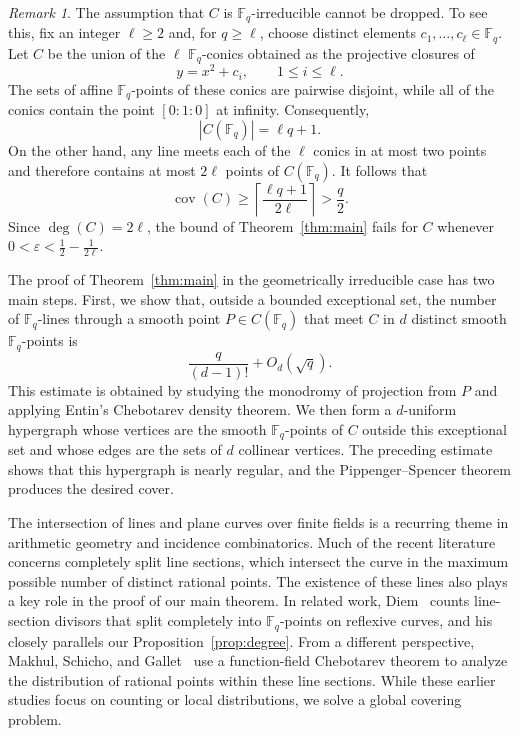 \documentclass[12pt,reqno]{amsart}
\theoremstyle{definition}
\theoremstyle{remark}
\newtheorem{remark}[theorem]{Remark}
\newcommand{\Fq}{\mathbb{F}_q}
\begin{document}
\begin{remark}\label{rem:Fq-irreducibility-necessary}
The assumption that $C$ is $\Fq$-irreducible cannot be dropped. To see this, fix an integer $\ell\geq 2$ and, for $q\geq\ell$, choose distinct elements $c_1,\ldots,c_\ell\in\Fq$. Let $C$ be the union of the $\ell$ $\Fq$-conics obtained as the projective closures of
\[
y=x^2+c_i,\qquad 1\leq i\leq\ell.
\]
The sets of affine $\Fq$-points of these conics are pairwise disjoint, while all of the conics contain the point $[0:1:0]$ at infinity. Consequently,
\[
|C(\Fq)|=\ell q+1.
\]
On the other hand, any line meets each of the $\ell$ conics in at most two points and therefore contains at most $2\ell$ points of $C(\Fq)$. It follows that
\[
\operatorname{cov}(C)
\geq
\left\lceil\frac{\ell q+1}{2\ell}\right\rceil
>
\frac{q}{2}.
\]
Since $\deg(C)=2\ell$, the bound of Theorem~\ref{thm:main} fails for $C$ whenever $0<\varepsilon<\frac12-\frac{1}{2\ell}$.
\end{remark}

The proof of Theorem~\ref{thm:main} in the geometrically irreducible case has two main steps. First, we show that, outside a bounded exceptional set, the number of $\Fq$-lines through a smooth point $P\in C(\Fq)$ that meet $C$ in $d$ distinct smooth $\Fq$-points is
\[
\frac{q}{(d-1)!}+O_d(\sqrt q).
\]
This estimate is obtained by studying the monodromy of projection from $P$ and applying Entin's Chebotarev density theorem. We then form a $d$-uniform hypergraph whose vertices are the smooth $\Fq$-points of $C$ outside this exceptional set and whose edges are the sets of $d$ collinear vertices. The preceding estimate shows that this hypergraph is nearly regular, and the Pippenger--Spencer theorem produces the desired cover.

The intersection of lines and plane curves over finite fields is a recurring theme in arithmetic geometry and incidence combinatorics. Much of the recent literature concerns completely split line sections, which intersect the curve in the maximum possible number of distinct rational points. The existence of these lines also plays a key role in the proof of our main theorem. In related work, Diem~\cite{Die12} counts line-section divisors that split completely into $\Fq$-points on reflexive curves, and his \cite[Proposition~10]{Die12} closely parallels our Proposition~\ref{prop:degree}. From a different perspective, Makhul, Schicho, and Gallet~\cite{MSG20} use a function-field Chebotarev theorem to analyze the distribution of rational points within these line sections. While these earlier studies focus on counting or local distributions, we solve a global covering problem.
\end{document}
